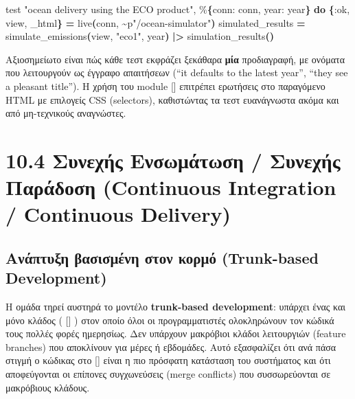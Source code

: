\documentclass[11pt,a4paper,greek,twoside]{template-xe}
\let\origtexttt\texttt
\renewcommand{\texttt}[1]{%
  \begingroup
  \StrSubstitute{#1}{.}{.\allowbreak}[\tttmp]%
  \origtexttt{\tttmp}%
  \endgroup
}
\newenvironment{Shaded}{\begin{english}\begin{snugshade}}{\end{snugshade}\end{english}}
\newcommand{\FunctionTok}[1]{\textcolor[rgb]{0.13,0.29,0.53}{\textbf{#1}}}
\newcommand{\KeywordTok}[1]{\textcolor[rgb]{0.13,0.29,0.53}{\textbf{#1}}}
\newcommand{\NormalTok}[1]{#1}
\newcommand{\OperatorTok}[1]{\textcolor[rgb]{0.81,0.36,0.00}{\textbf{#1}}}
\newcommand{\StringTok}[1]{\textcolor[rgb]{0.31,0.60,0.02}{#1}}
\newcommand{\VariableTok}[1]{\textcolor[rgb]{0.00,0.00,0.00}{#1}}
\begin{document}
\begin{Shaded}
\begin{Highlighting}[]
\NormalTok{    test }\StringTok{"ocean delivery using the ECO product"}\NormalTok{, \%}\FunctionTok{\{}\VariableTok{conn:}\NormalTok{ conn, }\VariableTok{year:}\NormalTok{ year}\FunctionTok{\}} \KeywordTok{do}
      \FunctionTok{\{}\VariableTok{:ok}\NormalTok{, view, \_html}\FunctionTok{\}} \OperatorTok{=}\NormalTok{ live}\FunctionTok{(}\NormalTok{conn, }\OperatorTok{\textasciitilde{}}\NormalTok{p}\StringTok{"/ocean{-}simulator"}\FunctionTok{)}
\NormalTok{      simulated\_results }\OperatorTok{=}\NormalTok{ simulate\_emissions}\FunctionTok{(}\NormalTok{view, }\StringTok{"eco1"}\NormalTok{, year}\FunctionTok{)} \OperatorTok{|\textgreater{}}\NormalTok{ simulation\_results}\FunctionTok{()}
\end{Highlighting}
\end{Shaded}

Αξιοσημείωτο είναι πώς κάθε τεστ εκφράζει ξεκάθαρα \textbf{μία}
προδιαγραφή, με ονόματα που λειτουργούν ως έγγραφο απαιτήσεων (``it
defaults to the latest year'', ``they see a pleasant title''). Η χρήση
του module \texttt{HtmlQuery} επιτρέπει ερωτήσεις στο παραγόμενο HTML με
επιλογείς CSS (selectors), καθιστώντας τα τεστ ευανάγνωστα ακόμα και από
μη-τεχνικούς αναγνώστες.

\section{10.4 Συνεχής Ενσωμάτωση / Συνεχής Παράδοση (Continuous
Integration / Continuous
Delivery)}\label{ux3c3ux3c5ux3bdux3b5ux3c7ux3aeux3c2-ux3b5ux3bdux3c3ux3c9ux3bcux3acux3c4ux3c9ux3c3ux3b7-ux3c3ux3c5ux3bdux3b5ux3c7ux3aeux3c2-ux3c0ux3b1ux3c1ux3acux3b4ux3bfux3c3ux3b7-continuous-integration-continuous-delivery}

\subsection{Ανάπτυξη βασισμένη στον κορμό (Trunk-based
Development)}\label{ux3b1ux3bdux3acux3c0ux3c4ux3c5ux3beux3b7-ux3b2ux3b1ux3c3ux3b9ux3c3ux3bcux3adux3bdux3b7-ux3c3ux3c4ux3bfux3bd-ux3baux3bfux3c1ux3bcux3cc-trunk-based-development}

Η ομάδα τηρεί αυστηρά το μοντέλο \textbf{trunk-based development}:
υπάρχει ένας και μόνο κλάδος (\texttt{main}) στον οποίο όλοι οι
προγραμματιστές ολοκληρώνουν τον κώδικά τους πολλές φορές ημερησίως. Δεν
υπάρχουν μακρόβιοι κλάδοι λειτουργιών (feature branches) που αποκλίνουν
για μέρες ή εβδομάδες. Αυτό εξασφαλίζει ότι ανά πάσα στιγμή ο κώδικας
στο \texttt{main} είναι η πιο πρόσφατη κατάσταση του συστήματος και ότι
αποφεύγονται οι επίπονες συγχωνεύσεις (merge conflicts) που
συσσωρεύονται σε μακρόβιους κλάδους.
\end{document}
